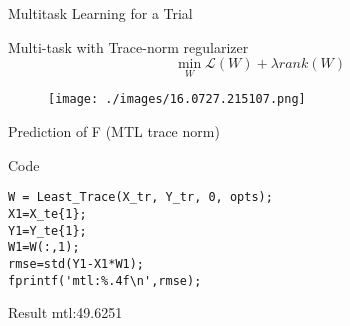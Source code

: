 \documentclass[bigger]{beamer}
\begin{document}
\begin{frame}[label=sec-4-5]{Multitask Learning for a Trial}
\begin{block}{Multi-task with Trace-norm regularizer}
\begin{equation*}
\min_W \mathcal{L}(W) + \lambda rank(W)
\end{equation*}
\end{block}
\begin{figure}[htb]
\centering
\texttt{[image: ./images/16.0727.215107.png]}
\end{figure}
\end{frame}
\begin{frame}[fragile,label=sec-4-6]{Prediction of F (MTL trace norm)}
 \begin{block}{Code}
\begin{verbatim}
W = Least_Trace(X_tr, Y_tr, 0, opts);
X1=X_te{1};
Y1=Y_te{1};
W1=W(:,1);
rmse=std(Y1-X1*W1);
fprintf('mtl:%.4f\n',rmse);
\end{verbatim}
\end{block}
\begin{block}{Result}
mtl:49.6251
\end{block}
\end{frame}
\end{document}
